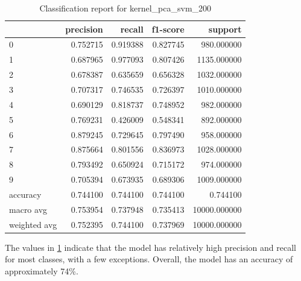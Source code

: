 \begin{table}[htb!]
    \centering
    \caption{Classification report for kernel_pca_svm_200}
    \label{tab:classification-report-kernel_pca_svm_200}
    \begin{tabular}{lrrrr}
    \toprule
     & precision & recall & f1-score & support \\
    \midrule
    0 & 0.752715 & 0.919388 & 0.827745 & 980.000000 \\
    1 & 0.687965 & 0.977093 & 0.807426 & 1135.000000 \\
    2 & 0.678387 & 0.635659 & 0.656328 & 1032.000000 \\
    3 & 0.707317 & 0.746535 & 0.726397 & 1010.000000 \\
    4 & 0.690129 & 0.818737 & 0.748952 & 982.000000 \\
    5 & 0.769231 & 0.426009 & 0.548341 & 892.000000 \\
    6 & 0.879245 & 0.729645 & 0.797490 & 958.000000 \\
    7 & 0.875664 & 0.801556 & 0.836973 & 1028.000000 \\
    8 & 0.793492 & 0.650924 & 0.715172 & 974.000000 \\
    9 & 0.705394 & 0.673935 & 0.689306 & 1009.000000 \\
    accuracy & 0.744100 & 0.744100 & 0.744100 & 0.744100 \\
    macro avg & 0.753954 & 0.737948 & 0.735413 & 10000.000000 \\
    weighted avg & 0.752395 & 0.744100 & 0.737969 & 10000.000000 \\
    \bottomrule
    \end{tabular}
    \end{table}


The values in \ref{tab:classification-report-kernel_pca_svm_200} indicate that the model has relatively high precision and recall for most classes, with a few exceptions. Overall, the model has an accuracy of approximately 74\%.

